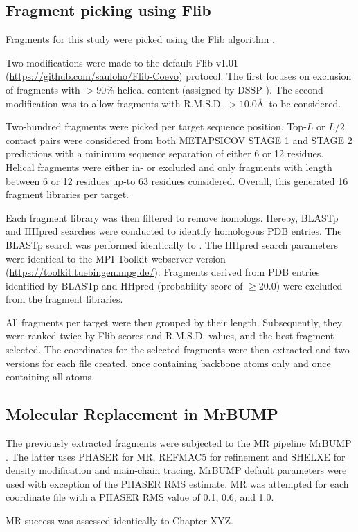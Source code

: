 
\subsection{Fragment picking using Flib}
Fragments for this study were picked using the Flib algorithm \cite{De_Oliveira2015-ba}. 

Two modifications were made to the default Flib v1.01 (\url{https://github.com/sauloho/Flib-Coevo}) protocol. The
first focuses on exclusion of fragments with $>90$\% helical content (assigned by DSSP \cite{Frishman1995-ns}). The second modification
was to allow fragments with R.M.S.D. $>10.0$\AA\ to be considered.

Two-hundred fragments were picked per target sequence position. Top-$L$ or $L/2$ contact pairs were considered from both
METAPSICOV STAGE 1 and STAGE 2 predictions with a minimum sequence separation of either 6 or 12 residues. Helical
fragments were either in- or excluded and only fragments with length between 6 or 12 residues up-to 63 residues
considered. Overall, this generated 16 fragment libraries per target. 

Each fragment library was then filtered to remove homologs. Hereby, BLASTp \cite{Altschul1990-nc} and HHpred
\cite{Soding2005-sx} searches were conducted to identify homologous PDB entries. The BLASTp search was performed identically to \cite{De_Oliveira2015-ba}. The HHpred search parameters were identical to the MPI-Toolkit \cite{Biegert2006-ny} webserver version (\url{https://toolkit.tuebingen.mpg.de/}). Fragments derived from PDB entries identified by BLASTp and HHpred (probability score of $\geq20.0$) were excluded from the fragment libraries.

All fragments per target were then grouped by their length. Subsequently, they were ranked twice by Flib scores and
R.M.S.D. values, and the best fragment selected. The coordinates for the selected fragments were then extracted and two
versions for each file created, once containing backbone atoms only and once containing all atoms.

\subsection{Molecular Replacement in MrBUMP}
The previously extracted fragments were subjected to the MR pipeline MrBUMP \cite{Keegan2008-hk}. The latter uses PHASER
\cite{McCoy2007-bf} for MR, REFMAC5 \cite{Murshudov2011-we} for refinement and SHELXE \cite{Thorn2013-ir} for density modification and main-chain tracing. MrBUMP default parameters were used with exception of the PHASER RMS estimate. MR was attempted for each coordinate file with a PHASER RMS value of 0.1, 0.6, and 1.0.

MR success was assessed identically to Chapter XYZ.
